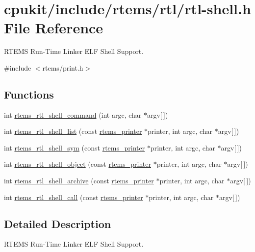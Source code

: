 \hypertarget{rtl-shell_8h}{}\section{cpukit/include/rtems/rtl/rtl-\/shell.h File Reference}
\label{rtl-shell_8h}


R\+T\+E\+MS Run-\/\+Time Linker E\+LF Shell Support.  


{\ttfamily \#include $<$rtems/print.\+h$>$}\newline
\subsection*{Functions}
\begin{DoxyCompactItemize}
\item 
int \mbox{\hyperlink{rtl-shell_8h_aa548220d324834be6c5703605f7aa127}{rtems\+\_\+rtl\+\_\+shell\+\_\+command}} (int argc, char $\ast$argv\mbox{[}$\,$\mbox{]})
\item 
int \mbox{\hyperlink{rtl-shell_8h_a1f9b3cb0aafe4ed009d797499b64e9e4}{rtems\+\_\+rtl\+\_\+shell\+\_\+list}} (const \mbox{\hyperlink{structrtems__printer}{rtems\+\_\+printer}} $\ast$printer, int argc, char $\ast$argv\mbox{[}$\,$\mbox{]})
\item 
int \mbox{\hyperlink{rtl-shell_8h_a50394981270941b025148ece371a0e5d}{rtems\+\_\+rtl\+\_\+shell\+\_\+sym}} (const \mbox{\hyperlink{structrtems__printer}{rtems\+\_\+printer}} $\ast$printer, int argc, char $\ast$argv\mbox{[}$\,$\mbox{]})
\item 
int \mbox{\hyperlink{rtl-shell_8h_ab9ed5fe1cd6d728c22f423a566b3ec1e}{rtems\+\_\+rtl\+\_\+shell\+\_\+object}} (const \mbox{\hyperlink{structrtems__printer}{rtems\+\_\+printer}} $\ast$printer, int argc, char $\ast$argv\mbox{[}$\,$\mbox{]})
\item 
int \mbox{\hyperlink{rtl-shell_8h_a6d62d1191b9362ec04fc2305eea21280}{rtems\+\_\+rtl\+\_\+shell\+\_\+archive}} (const \mbox{\hyperlink{structrtems__printer}{rtems\+\_\+printer}} $\ast$printer, int argc, char $\ast$argv\mbox{[}$\,$\mbox{]})
\item 
int \mbox{\hyperlink{rtl-shell_8h_a80ea92b004f787087876764852d994fd}{rtems\+\_\+rtl\+\_\+shell\+\_\+call}} (const \mbox{\hyperlink{structrtems__printer}{rtems\+\_\+printer}} $\ast$printer, int argc, char $\ast$argv\mbox{[}$\,$\mbox{]})
\end{DoxyCompactItemize}


\subsection{Detailed Description}
R\+T\+E\+MS Run-\/\+Time Linker E\+LF Shell Support. 



